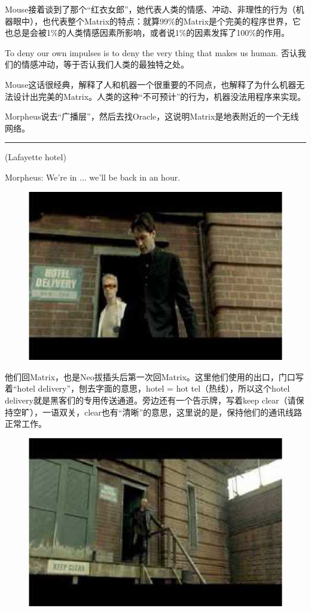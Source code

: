 \documentclass[UTF8]{ctexart}
\newcommand{\myparsep}{\noindent \rule[0.5ex]{\linewidth}{1pt}}
\newenvironment{myquote}{\color{green} \setlength{\leftskip}{6em} \setlength{\rightskip}{4em} \setlength{\parindent}{-2em}}{\par}
\begin{document}
Mouse接着谈到了那个“红衣女郎”，她代表人类的情感、冲动、非理性的行为（机器眼中），也代表整个Matrix的特点：就算99\%的Matrix是个完美的程序世界，它也总是会被1\%的人类情感因素所影响，或者说1\%的因素发挥了100\%的作用。

To deny our own impulses is to deny the very thing that makes us human. 否认我们的情感冲动，等于否认我们人类的最独特之处。

Mouse这话很经典，解释了人和机器一个很重要的不同点，也解释了为什么机器无法设计出完美的Matrix。人类的这种“不可预计”的行为，机器没法用程序来实现。

Morpheus说去“广播层”，然后去找Oracle，这说明Matrix是地表附近的一个无线网络。

\myparsep

\begin{myquote}
(Lafayette hotel)

Morpheus: We're in ... we'll be back in an hour.
\end{myquote}

\begin{figure}[htb]
\centering
\includegraphics[width=0.5\linewidth]{fig/read_Matrix-40}
\end{figure}

他们回Matrix，也是Neo拔插头后第一次回Matrix。这里他们使用的出口，门口写着“hotel delivery”，刨去字面的意思，hotel = hot tel（热线），所以这个hotel delivery就是黑客们的专用传送通道。旁边还有一个告示牌，写着keep clear（请保持空旷），一语双关，clear也有“清晰”的意思，这里说的是，保持他们的通讯线路正常工作。

\begin{figure}[htb]
\centering
\includegraphics[width=0.5\linewidth]{fig/read_Matrix-41}
\end{figure}
\end{document}
